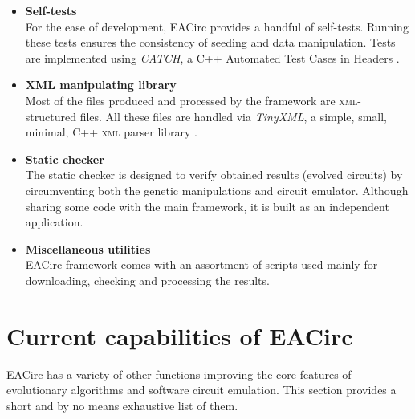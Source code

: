 \documentclass[12pt,twoside]{fithesis2}		%
\renewcommand{\_}{\leavevmode \kern0.0em\vbox{\hrule width0.4em}}
\newcommand{\squarebullet}{\textcolor{black}{\raisebox{0.15em}{\rule{4pt}{4pt}}}}
\newenvironment{myItemize}{
  \begin{itemize}[leftmargin=2em,rightmargin=1em,itemsep=\parskip ,parsep=0em,topsep=0em,partopsep=0em]
  \renewcommand{\labelitemi}{\squarebullet}
  \renewcommand{\labelitemii}{$\diamond$}
}{
  \end{itemize}
}
\begin{document}
\begin{myItemize}
configurable biased generator and low-entropy MD5-based generator.
\item \textbf{Self-tests}\\
For the ease of development, EACirc provides a handful of self-tests. Running these tests ensures the consistency
of seeding and data manipulation. Tests are implemented using \textit{CATCH}, a C++ Automated Test Cases in Headers \parencite{catch}.
\item \textbf{XML manipulating library}\\
Most of the files produced and processed by the framework are \textsc{xml}-structured files. All these files are handled via
\textit{TinyXML}, a simple, small, minimal, C++ \textsc{xml} parser library \parencite{tinyxml}.
\item \textbf{Static checker}\\
The static checker is designed to verify obtained results (evolved circuits) by circumventing both the genetic 
manipulations and circuit emulator. Although sharing some code with the main framework, it is built as an independent application.
\item \textbf{Miscellaneous utilities}\\
EACirc framework comes with an assortment of scripts used mainly for downloading, checking and processing the results.
\end{myItemize}

\section{Current capabilities of EACirc}
\label{sec:eacirc-capabilities}

EACirc has a variety of other functions improving the core features of evolutionary algorithms and software circuit emulation.
This section provides a short and by no means exhaustive list of them.
\end{document}
